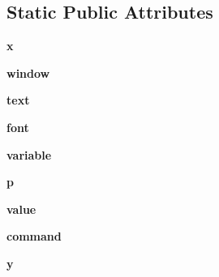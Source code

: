 \subsection*{Static Public Attributes}
\begin{DoxyCompactItemize}
\item 
\mbox{\label{class_f_i_n_a_l___g_u_i___w_l_a_n_1_1_w_l_a_n_aeac6709da443ca41de175c549eb0caa7}} 
{\bfseries x}
\item 
\mbox{\label{class_f_i_n_a_l___g_u_i___w_l_a_n_1_1_w_l_a_n_a720cbd5ab0bfa70f33b4df4d9eb5f1fb}} 
{\bfseries window}
\item 
\mbox{\label{class_f_i_n_a_l___g_u_i___w_l_a_n_1_1_w_l_a_n_a0ae2586e259735d79d24bc6cf90028b6}} 
{\bfseries text}
\item 
\mbox{\label{class_f_i_n_a_l___g_u_i___w_l_a_n_1_1_w_l_a_n_a6eeb65cc4d61327e371a6e387b1cdf2b}} 
{\bfseries font}
\item 
\mbox{\label{class_f_i_n_a_l___g_u_i___w_l_a_n_1_1_w_l_a_n_a28d6012cc35be2a2cd22a5b076c8120d}} 
{\bfseries variable}
\item 
\mbox{\label{class_f_i_n_a_l___g_u_i___w_l_a_n_1_1_w_l_a_n_acef6c9f6008d440075ab4c3abf3f1587}} 
{\bfseries p}
\item 
\mbox{\label{class_f_i_n_a_l___g_u_i___w_l_a_n_1_1_w_l_a_n_a582d45150d973913b12e7254915d4ad9}} 
{\bfseries value}
\item 
\mbox{\label{class_f_i_n_a_l___g_u_i___w_l_a_n_1_1_w_l_a_n_aae67fe842d0706519efdfb4555a5fefd}} 
{\bfseries command}
\item 
\mbox{\label{class_f_i_n_a_l___g_u_i___w_l_a_n_1_1_w_l_a_n_a6104642e833ec3c75685f2632fc9de90}} 
{\bfseries y}
\item 
\mbox{\label{class_f_i_n_a_l___g_u_i___w_l_a_n_1_1_w_l_a_n_aabd629581a558bbccec717f8ee9f6acf}} 

\end{DoxyCompactItemize}
